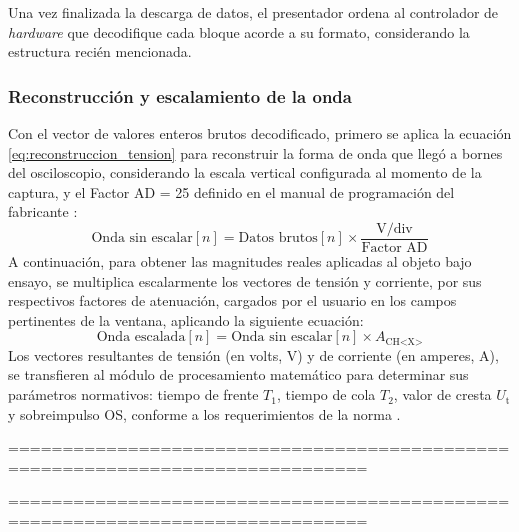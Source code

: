 Una vez finalizada la descarga de datos, el presentador ordena al controlador de \emph{hardware} que decodifique cada bloque acorde a su formato, considerando la estructura recién mencionada.

\subsubsection{Reconstrucción y escalamiento de la onda}

Con el vector de valores enteros brutos decodificado, primero se aplica la ecuación \autoref{eq:reconstruccion_tension} para reconstruir la forma de onda que llegó a bornes del osciloscopio, considerando la escala vertical configurada al momento de la captura, y el Factor AD = \num{25} definido en el manual de programación del fabricante \cite{gds1000au_ProgrammingManual}:
\begin{equation}
\label{eq:reconstruccion_tension}
\text{Onda sin escalar}[n] = \text{Datos brutos}[n] \times \frac{{\text{V/div}}}{\text{Factor AD}}
\end{equation}
A continuación, para obtener las magnitudes reales aplicadas al objeto bajo ensayo, se multiplica escalarmente los vectores de tensión y corriente, por sus respectivos factores de atenuación, cargados por el usuario en los campos pertinentes de la ventana, aplicando la siguiente ecuación:
\begin{equation}
\label{eq:reconstruccion_tension_total}
{\text{Onda escalada}}[n] = \text{Onda sin escalar}[n] \times A_{\text{CH<X>}}
\end{equation}
Los vectores resultantes de tensión (en volts, \unit{\volt}) y de corriente (en amperes, \unit{\ampere}), se transfieren al módulo de procesamiento matemático para determinar sus parámetros normativos: tiempo de frente $T_1$, tiempo de cola $T_2$, valor de cresta $U_{\text{t}}$ y sobreimpulso OS, conforme a los requerimientos de la norma \cite{iec60060_1}.






\newpage

\noindent
===============================================================================


\noindent
===============================================================================